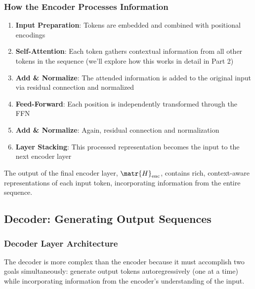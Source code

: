 \subsubsection{How the Encoder Processes Information}

\begin{enumerate}
  \item \textbf{Input Preparation}: Tokens are embedded and combined with positional encodings
  \item \textbf{Self-Attention}: Each token gathers contextual information from all other tokens in the sequence (we'll explore how this works in detail in Part 2)
  \item \textbf{Add \& Normalize}: The attended information is added to the original input via residual connection and normalized
  \item \textbf{Feed-Forward}: Each position is independently transformed through the FFN
  \item \textbf{Add \& Normalize}: Again, residual connection and normalization
  \item \textbf{Layer Stacking}: This processed representation becomes the input to the next encoder layer
\end{enumerate}

The output of the final encoder layer, $\matr{H}_{\text{enc}}$, contains rich, context-aware representations of each input token, incorporating information from the entire sequence.

\subsection{Decoder: Generating Output Sequences}

\subsubsection{Decoder Layer Architecture}

The decoder is more complex than the encoder because it must accomplish two goals simultaneously: generate output tokens autoregressively (one at a time) while incorporating information from the encoder's understanding of the input.

